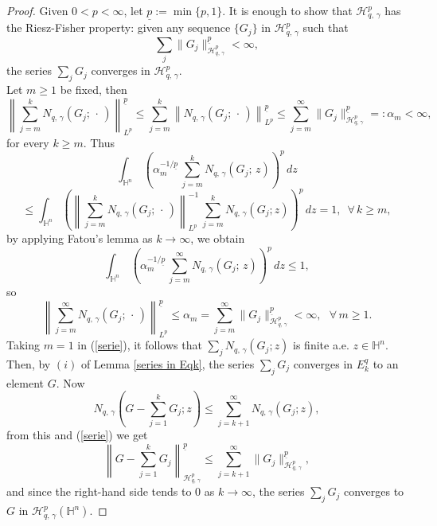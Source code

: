 \documentclass[reqno,10pt]{article}
\theoremstyle{definition}
\numberwithin{equation}{section}
\numberwithin{theorem}{section}
\begin{document}
\begin{proof} Given $0 < p < \infty$, let $\underline{p} := \min\{ p, 1 \}$. It is enough to show that $\mathcal{H}^{p}_{q, \, \gamma}$ has the Riesz-Fisher property: given any sequence $\{ G_j \}$ in 
$\mathcal{H}^{p}_{q, \, \gamma}$ such that 
\[
\sum_{j} \| G_j \|_{\mathcal{H}^{p}_{q, \, \gamma}}^{\underline{p}} < \infty,
\]
the series $\sum_{j} G_j$ converges in $\mathcal{H}^{p}_{q, \, \gamma}$. \\
Let $m \geq 1$ be fixed, then 
\[
\left\| \sum_{j=m}^{k} N_{q, \, \gamma}(G_{j}; \, \cdot \,) \right\|_{L^p}^{\underline{p}} \leq \sum_{j=m}^{k} \left\| N_{q, \, \gamma}(G_{j}; \, \cdot \,) \right\|_{L^p}^{\underline{p}} \leq \sum_{j=m}^{\infty} \| G_j \|_{\mathcal{H}^{p}_{q, \, \gamma}}^{\underline{p}} 
=: \alpha_m < \infty,
\]
for every $k \geq m$. Thus 
\[
\int_{\mathbb{H}^{n}} \, \left( \alpha_m^{-1/ \underline{p}} \, \sum_{j=m}^{k} N_{q, \, \gamma}(G_{j}; \, z ) \right)^{p} \, dz
\]
\[ 
\leq \int_{\mathbb{H}^{n}} \left( \left\| \sum_{j=m}^{k} N_{q, \, \gamma}(G_{j}; \, \cdot \,) \right\|_{L^p}^{-1} \, \sum_{j=m}^{k} N_{q, \, \gamma}(G_{j};  z ) \right)^{p} \, dz =1, \,\,\, \forall \, k \geq m,
\]
by applying Fatou's lemma as $k \rightarrow \infty$, we obtain
\[
\int_{\mathbb{H}^{n}} \, \left( \alpha_m^{-1/\underline{p}} \, \sum_{j=m}^{\infty} N_{q, \, \gamma}(G_{j}; \, z ) \right)^{p} \, dz \leq 1,
\]
so
\begin{equation}
\left\|  \sum_{j=m}^{\infty} N_{q, \, \gamma}(G_{j}; \, \cdot \,) \right\|_{L^p}^{\underline{p}} \leq \alpha_m = \sum_{j=m}^{\infty} \| G_j \|_{\mathcal{H}^{p}_{q, \, \gamma}}^{\underline{p}} < \infty, \,\,\,\, \forall \, m \geq 1  \label{serie}.
\end{equation}
Taking $m = 1$ in (\ref{serie}), it follows that $\sum_{j} N_{q, \, \gamma}(G_{j}; z)$ is finite a.e. 
$z \in \mathbb{H}^{n}$. Then, by $(i)$ of Lemma \ref{series in Eqk}, the series $\sum_j G_j$ converges in $E_{k}^{q}$ to an element $G$. Now 
\[
N_{q, \, \gamma}\left( G - \sum_{j=1}^{k} G_j; z \right) \leq \sum_{j=k+1}^{\infty} N_{q, \, \gamma} (G_j; z),
\]
from this and (\ref{serie}) we get
\[
\left\| G - \sum_{j=1}^{k} G_j \right\|_{\mathcal{H}^{p}_{q, \, \gamma}}^{\underline{p}} \leq \sum_{j=k+1}^{\infty} 
\| G_j \|_{\mathcal{H}^{p}_{q, \, \gamma}}^{\underline{p}},
\]
and since the right-hand side tends to $0$ as $k \rightarrow \infty$, the series $\sum_{j}G_j$ converges to $G$ in $\mathcal{H}^{p}_{q, \, \gamma}(\mathbb{H}^{n})$.
\end{proof}
\end{document}
